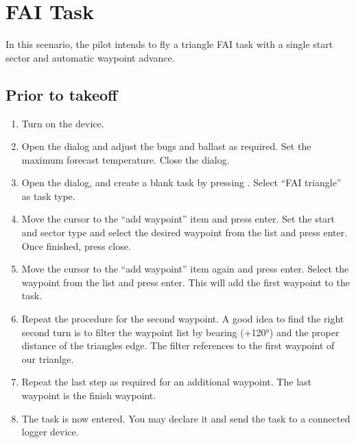 \documentclass[a4paper,12pt]{refrep}
\begin{document}
\section{FAI Task}\label{sec:fai-task}

In this scenario, the pilot intends to fly a triangle FAI task with a
single start sector and automatic waypoint advance.

\subsection*{Prior to takeoff}
\begin{enumerate}
\item  Turn on the device.
\item  Open the  dialog and adjust the bugs and ballast as
required. Set the maximum forecast temperature.  Close the dialog.
\item  Open the  dialog, and create a blank task by pressing
. Select ``FAI triangle'' as task type.
\item  Move the cursor to the ``add waypoint'' item and press enter.  Set the
start and sector type and select the desired waypoint from the list and press enter.  Once finished, press close.
\item  Move the cursor to the ``add waypoint'' item again and press enter. 
Select the waypoint from the list and press enter.  This will add the first waypoint to the task.
\item  Repeat the procedure for the second waypoint. A good idea to find the
right second turn is to filter the waypoint list by bearing (+120°) and the
proper distance of the triangles edge. The filter references to
the first waypoint of our trianlge.
\item  Repeat the last step as required for an additional waypoint.  The last
waypoint is the finish waypoint.
\item  The task is now entered.  You may declare it and send the task to a
connected logger device.
\end{enumerate}
\end{document}
